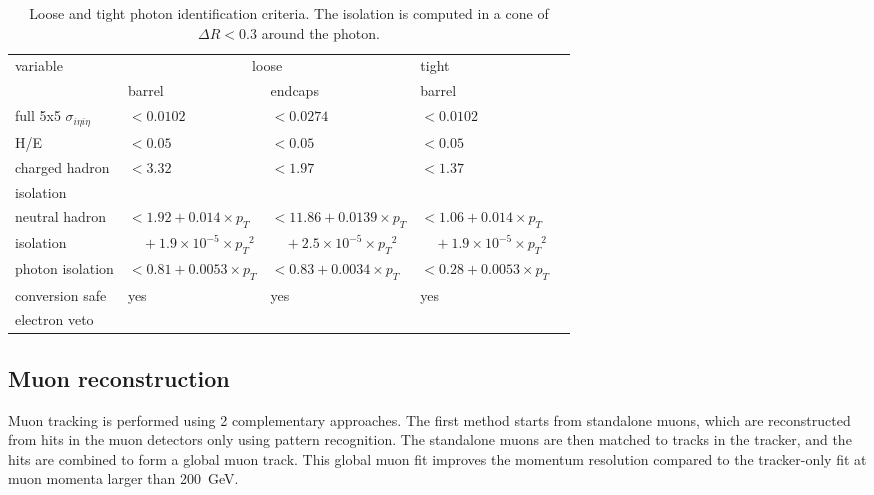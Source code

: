 \renewcommand{\arraystretch}{1.1}
\begin{table}[ht!]
\centering
\footnotesize
\caption{Loose and tight photon identification criteria. The isolation is computed in a cone of $\Delta R < 0.3$ around the photon.}
\begin{tabular}{|l|l|l||l|c|}
\hline
\multirow{2}{*}{variable}                             &  \multicolumn{2}{c||}{loose} & tight \\
\cline{2-4}
                                                            &  barrel        & endcaps  &  barrel  \\
\hline
full 5x5 $\sigma_{i\eta i\eta}$            & $< 0.0102$                                                  & $< 0.0274$    & $< 0.0102$     \\
H/E                                        & $< 0.05$                                                    & $< 0.05$     & $< 0.05$      \\
charged hadron                   & \multirow{2}{*}{$< 3.32$}  & \multirow{2}{*}{$< 1.97$}    & \multirow{2}{*}{$< 1.37$}    \\
 isolation        &     &      &   \\
neutral hadron  & $< 1.92 + 0.014\times p_T$ & $< 11.86 + 0.0139\times p_T$ & $< 1.06 + 0.014\times p_T$  \\
isolation          & $\quad +1.9\times 10^{-5} \times {p_T}^2$  & $\quad +2.5\times 10^{-5} \times {p_T}^2$ & $\quad +1.9\times 10^{-5} \times {p_T}^2$ \\
photon isolation                           & $< 0.81 + 0.0053\times p_T$                                 & $< 0.83 + 0.0034\times p_T$ & $< 0.28 + 0.0053\times p_T$   \\
conversion safe             & \multirow{2}{*}{yes}                                                         & \multirow{2}{*}{yes}        & \multirow{2}{*}{yes}       \\
electron veto              &      &   &  \\
\hline
\end{tabular}
\label{tab:PhotonID}
\end{table}

\subsection{Muon reconstruction}
\label{sec:muon_reconstruction}

Muon tracking is performed using 2 complementary approaches. The first method starts from standalone muons, which are reconstructed from hits in the muon detectors only using pattern recognition. The standalone muons are then matched to tracks in the tracker, and the hits are combined to form a global muon track. This global muon fit improves the momentum resolution compared to the tracker-only fit at muon momenta larger than \SI{200}{GeV}.

